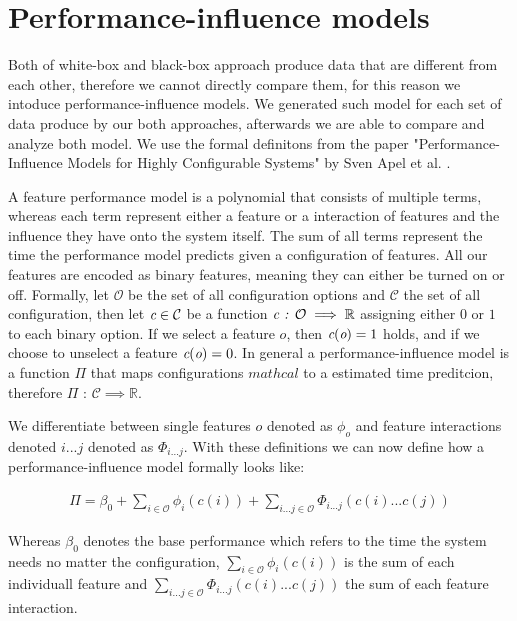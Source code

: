 \chapter{Performance-influence models}\label{ch:performance-influence-models}

Both of white-box and black-box approach produce data that are different from each other, therefore we cannot directly compare them, for 
this reason we intoduce performance-influence models. We generated such model for each set of data produce by our both approaches, afterwards
we are able to compare and analyze both model. We use the formal definitons from the paper "Performance-Influence Models for
Highly Configurable Systems" by Sven Apel et al. \cite{Performance-influence-models-for-highly-configurable-systems}.

A feature performance model is a polynomial that consists of multiple terms, whereas each term represent either a feature or a interaction
of features and the influence they have onto the system itself. The sum of all terms represent the time the performance model predicts
given a configuration of features. All our features are encoded as binary features, meaning they can either be turned on or off. Formally, 
let $\mathcal{O}$ be the set of all configuration options and $\mathcal{C}$ the set of all configuration, then  let $\emph{c} \in \mathcal{C}$ be
a function $\emph{c} \textit{ : } \mathcal{O} \implies \mathbb{R}$ assigning either $0$ or $1$ to each binary option. If we select a feature
$o$, then $\emph{c}(\emph{o}) = 1$ holds, and if we choose to unselect a feature $\emph{c}(\emph{o}) = 0$. In general a performance-influence
model is a function $\Pi$ that maps configurations $mathcal$ to a estimated time preditcion, therefore $\Pi \textit{ : } \mathcal{C} \implies \mathbb{R}$.

We differentiate between single features $o$ denoted as $\phi_o$ and feature interactions denoted $i ... j$ denoted as $\Phi_{i...j}$. With these
definitions we can now define how a performance-influence model formally looks like:

\begin{gather}
    \Pi = \beta_0 + \sum_{i \in \mathcal{O}} \phi_i(c(i)) + \sum_{i...j \in \mathcal{O}} \Phi_{i...j}(c(i)...c(j))
\end{gather}

Whereas $\beta_0$ denotes the base performance which refers to the time the system needs no matter the configuration, $\sum_{i \in \mathcal{O}} \phi_i(c(i))$
is the sum of each individuall feature and $\sum_{i...j \in \mathcal{O}} \Phi_{i...j}(c(i)...c(j))$ the sum of each feature interaction.


